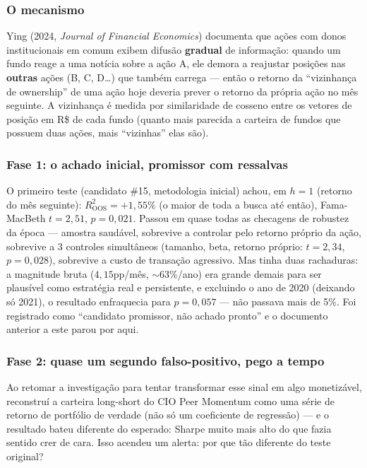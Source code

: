 \documentclass[11pt,a4paper]{article}
\begin{document}
\subsubsection{O mecanismo}

Ying (2024, \emph{Journal of Financial Economics}) documenta que ações com
donos institucionais em comum exibem difusão \textbf{gradual} de
informação: quando um fundo reage a uma notícia sobre a ação A, ele
demora a reajustar posições nas \textbf{outras} ações (B, C, D\ldots) que
também carrega --- então o retorno da ``vizinhança de ownership'' de uma
ação hoje deveria prever o retorno da própria ação no mês seguinte. A
vizinhança é medida por similaridade de cosseno entre os vetores de posição
em R\$ de cada fundo (quanto mais parecida a carteira de fundos que possuem
duas ações, mais ``vizinhas'' elas são).

\subsubsection{Fase 1: o achado inicial, promissor com ressalvas}

O primeiro teste (candidato \#15, metodologia inicial) achou, em $h=1$
(retorno do mês seguinte): $R^2_{\text{OOS}}=+1{,}55\%$ (o maior de toda a
busca até então), Fama-MacBeth $t=2{,}51$, $p=0{,}021$. Passou em quase
todas as checagens de robustez da época --- amostra saudável, sobrevive a
controlar pelo retorno próprio da ação, sobrevive a 3 controles
simultâneos (tamanho, beta, retorno próprio: $t=2{,}34$, $p=0{,}028$),
sobrevive a custo de transação agressivo. Mas tinha duas rachaduras: a
magnitude bruta ($4{,}15$pp/mês, $\sim$63\%/ano) era grande demais para
ser plausível como estratégia real e persistente, e excluindo o ano de
2020 (deixando só 2021), o resultado enfraquecia para $p=0{,}057$ --- não
passava mais de 5\%. Foi registrado como ``candidato promissor, não achado
pronto'' e o documento anterior a este parou por aqui.

\subsubsection{Fase 2: quase um segundo falso-positivo, pego a tempo}

Ao retomar a investigação para tentar transformar esse sinal em algo
monetizável, reconstruí a carteira long-short do CIO Peer Momentum como
uma série de retorno de portfólio de verdade (não só um coeficiente de
regressão) --- e o resultado bateu diferente do esperado: Sharpe muito
mais alto do que fazia sentido crer de cara. Isso acendeu um alerta:
por que tão diferente do teste original?
\end{document}
